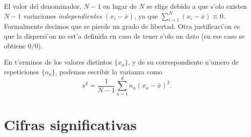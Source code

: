 \documentclass[letterpaper,11pt]{report}
\begin{document}
 El valor del denominador, $N-1$ en lugar de $N$ se elige debido a que s'olo existen $N-1$ variaciones \textit{independientes} $(x_i-\bar{x})$, ya que $\sum_{i=1}^N (x_i-\bar{x})\equiv 0$. Formalmente decimos que se pierde un grado de libertad. Otra justificaci'on es que la dispersi'on no est'a definida en caso de tener s'olo un dato (en ese caso se obtiene $0/0$).

En t'erminos de los valores distintos $\lbrace x_a\rbrace$, y de su correspondiente n'umero de repeticiones $\lbrace n_a\rbrace$, podemos escribir la varianza como
\begin{equation}
s^2=\frac{1}{N-1}\sum_{a=1}^{d}n_a(x_a-\bar{x})^2.
\end{equation}

%


\section{Cifras significativas}
\end{document}
